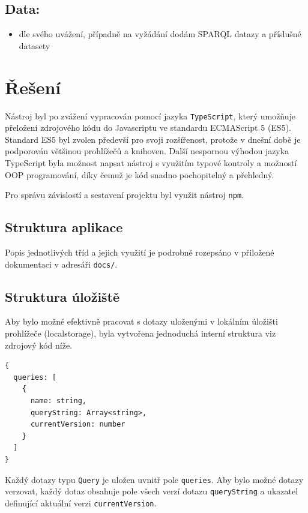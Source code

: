 \documentclass[
12pt,
a4paper,
pdftex,
czech,
titlepage
]{article}
\begin{document}
\hypertarget{data}{%
\subsection{Data:}\label{data}}

\begin{itemize}
\item
  dle svého uvážení, případně na vyžádání dodám SPARQL datazy a
  příslušné datasety
\end{itemize}

\section{Řešení}

Nástroj byl po zvážení vypracován pomocí jazyka \texttt{TypeScript}, který umožňuje přeložení zdrojového kódu do Javascriptu ve standardu ECMAScript 5 (ES5). Standard ES5 byl zvolen předevší pro svoji rozšířenost, protože v dnešní době je podporován většinou prohlížečů a knihoven. Další nespornou výhodou jazyka TypeScript byla možnost napsat nástroj s využitím typové kontroly a možností OOP programování, díky čemuž je kód snadno pochopitelný a přehledný. 

Pro správu závislostí a sestavení projektu byl využit nástroj \texttt{npm}.

\subsection{Struktura aplikace}
\label{sec:structure}

Popis jednotlivých tříd a jejich využití je podrobně rozepsáno v přiložené dokumentaci v adresáři \texttt{docs/}.

\subsection{Struktura úložiště}

Aby bylo možné efektivně pracovat s dotazy uloženými v lokálním úložišti prohlížeče (localstorage), byla vytvořena jednoduchá interní struktura viz zdrojový kód níže. 

\begin{Verbatim}[samepage=true]
{
  queries: [						
    {
      name: string,
      queryString: Array<string>,
      currentVersion: number
    }
  ]
}
\end{Verbatim}

Každý dotazy typu \texttt{Query} je uložen uvnitř pole \texttt{queries}. Aby bylo možné dotazy verzovat, každý dotaz obsahuje pole všech verzí dotazu \texttt{queryString} a ukazatel definující aktuální verzi \texttt{currentVersion}.
\end{document}
